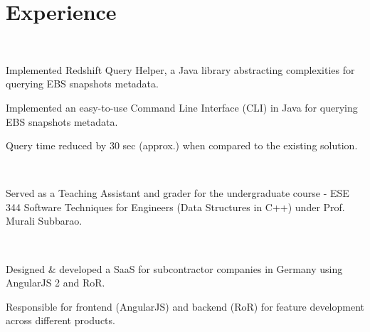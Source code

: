 \documentclass[]{deedy-resume-openfont}
\begin{document}

\section{Experience}
\hfill
{}\\
\begin{tightemize}
\item {}Implemented Redshift Query Helper, a Java library abstracting complexities for querying EBS snapshots metadata.
\item {}Implemented an easy-to-use Command Line Interface (CLI) in Java for querying EBS snapshots metadata.
\item Query time reduced by 30 sec (approx.) when compared to the existing solution.
\end{tightemize}

\hfill
{}\\
\begin{tightemize}
\item Served as a Teaching Assistant and grader for the undergraduate course - ESE 344 Software Techniques for Engineers (Data Structures in C++) under Prof. Murali Subbarao.
\end{tightemize}

\hfill
{}\\
\begin{tightemize}
\item {}Designed \& developed a SaaS for subcontractor companies in Germany using AngularJS 2 and RoR.
\item Responsible for frontend (AngularJS) and backend (RoR) for feature development across different products.
\end{tightemize}
\end{document}
